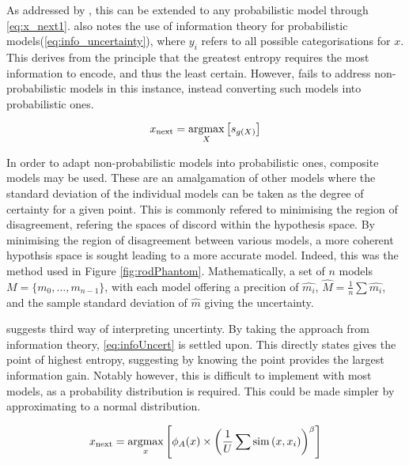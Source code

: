 As addressed by \textcite{Set09}, this can be extended to any probabilistic model through \ref{eq:x_next1}. \textcite{Set09} also notes the use of information theory for probabilistic models(\ref{eq:info_uncertainty}), where $y_i$ refers to all possible categorisations for $x$. This derives from the principle that the greatest entropy requires the most information to encode, and thus the least certain. However, \textcite{Set09} fails to address non-probabilistic models in this instance, instead converting such models into probabilistic ones.

\begin{equation}
  \label{eq:x_next1}
  x_\mathrm{next}=\operatorname*{argmax}_X{\left[s_{g(X)}\right]}
\end{equation}

In order to adapt non-probabilistic models into probabilistic ones, composite models may be used. These are an amalgamation of other models where the standard deviation of the individual models can be taken as the degree of certainty for a given point. This is commonly refered to minimising the region of disagreement, refering the spaces of discord within the hypothesis space. By minimising the region of disagreement between various models, a more coherent hypothsis space is sought leading to a more accurate model. Indeed, this was the method used in Figure \ref{fig:rodPhantom}. Mathematically, a set of $n$ models ${M = \{m_0,\ldots{}, m_{n-1}\}}$, with each model offering a precition of $\hat{m_i}$, ${\hat{M}=\frac{1}{n}\sum{\hat{m_i}}}$, and the sample standard deviation of $\hat{m}$ giving the uncertainty.


\textcite{Set09} suggests  third way of interpreting uncertinty. By taking the approach from information theory, \ref{eq:infoUncert} is settled upon. This directly states gives the point of highest entropy, suggesting by knowing the point provides the largest information gain. Notably however, this is difficult to implement with most models, as a probability distribution is required. This could be made simpler by approximating to a normal distribution.

\begin{equation}
  \label{eq:infoUncert}
  x_\mathrm{next}=\operatorname*{argmax}_x{\left[\phi_A(x)\times{\left(\frac{1}{U}\sum{\operatorname*{sim}{(x, x_i)}}\right)}^\beta\right]}
\end{equation}




